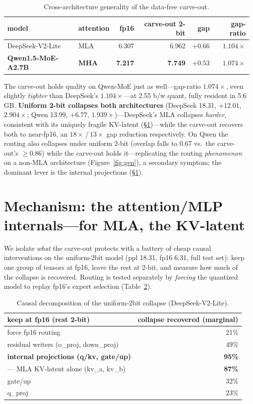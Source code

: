\documentclass[10pt]{article}
\begin{document}
\begin{table}[h]\centering\small
\begin{tabular}{llrrrr}
\toprule
model & attention & fp16 & carve-out 2-bit & gap & gap-ratio \\
\midrule
DeepSeek-V2-Lite & MLA & 6.307 & 6.962 & $+0.66$ & $1.104\times$ \\
\textbf{Qwen1.5-MoE-A2.7B} & \textbf{MHA} & \textbf{7.217} & \textbf{7.749} & \textbf{$+0.53$} & \textbf{$1.074\times$} \\
\bottomrule
\end{tabular}
\caption{Cross-architecture generality of the data-free carve-out.}
\label{tab:gen}
\end{table}

The carve-out holds quality on Qwen-MoE just as well---gap-ratio $1.074\times$, even slightly
\emph{tighter} than DeepSeek's $1.104\times$---at 2.55 b/w quant, fully resident in 5.6\,GB. \textbf{Uniform
2-bit collapses both architectures} (DeepSeek 18.31, $+12.01$, $2.904\times$; Qwen 13.99, $+6.77$,
$1.939\times$)---DeepSeek's MLA collapses \emph{harder}, consistent with its uniquely fragile KV-latent
(\S\ref{sec:mechanism})---while the carve-out recovers both to near-fp16, an $18\times$\,/\,$13\times$ gap
reduction respectively. On Qwen the routing also collapses under uniform 2-bit (overlap falls to 0.67 vs.\
the carve-out's $\geq0.86$) while the carve-out holds it---replicating the routing \emph{phenomenon} on a
non-MLA architecture (Figure~\ref{fig:gen}), a secondary symptom; the dominant lever is the internal
projections (\S\ref{sec:mechanism}).

\section{Mechanism: the attention/MLP internals---for MLA, the KV-latent}\label{sec:mechanism}
We isolate \emph{what} the carve-out protects with a battery of cheap causal interventions on the
uniform-2bit model (ppl 18.31, fp16 6.31, full test set): keep one group of tensors at fp16, leave the rest at 2-bit,
and measure how much of the collapse is recovered. Routing is tested separately by \emph{forcing} the
quantized model to replay fp16's expert selection (Table~\ref{tab:decomp}).

\begin{table}[h]\centering\small
\begin{tabular}{lr}
\toprule
keep at fp16 (rest 2-bit) & collapse recovered (marginal) \\
\midrule
force fp16 routing & 21\% \\
residual writers (o\_proj, down\_proj) & 49\% \\
\textbf{internal projections (q/kv, gate/up)} & \textbf{95\%} \\
\quad--- MLA KV-latent alone (kv\_a, kv\_b) & \textbf{87\%} \\
gate/up & 32\% \\
q\_proj & 23\% \\
\bottomrule
\end{tabular}
\caption{Causal decomposition of the uniform-2bit collapse (DeepSeek-V2-Lite).}
\label{tab:decomp}
\end{table}
\end{document}
